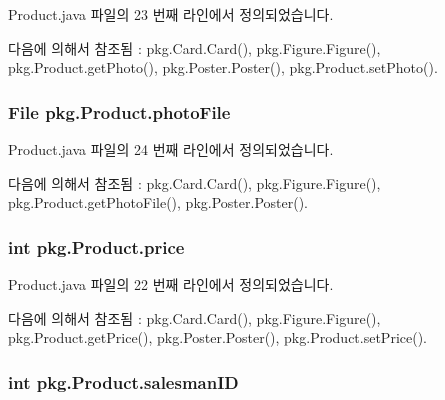 Product.\+java 파일의 23 번째 라인에서 정의되었습니다.



다음에 의해서 참조됨 \+:  pkg.\+Card.\+Card(), pkg.\+Figure.\+Figure(), pkg.\+Product.\+get\+Photo(), pkg.\+Poster.\+Poster(), pkg.\+Product.\+set\+Photo().

\subsubsection[{\texorpdfstring{photo\+File}{photoFile}}]{\setlength{\rightskip}{0pt plus 5cm}File pkg.\+Product.\+photo\+File\hspace{0.3cm}{\ttfamily [protected]}}\hypertarget{classpkg_1_1_product_a2eeaba74c302ecdc9dd288ff7527ac67}{}\label{classpkg_1_1_product_a2eeaba74c302ecdc9dd288ff7527ac67}


Product.\+java 파일의 24 번째 라인에서 정의되었습니다.



다음에 의해서 참조됨 \+:  pkg.\+Card.\+Card(), pkg.\+Figure.\+Figure(), pkg.\+Product.\+get\+Photo\+File(), pkg.\+Poster.\+Poster().

\subsubsection[{\texorpdfstring{price}{price}}]{\setlength{\rightskip}{0pt plus 5cm}int pkg.\+Product.\+price\hspace{0.3cm}{\ttfamily [protected]}}\hypertarget{classpkg_1_1_product_a46c6eb6906d4ee2f6393515f41dba7c9}{}\label{classpkg_1_1_product_a46c6eb6906d4ee2f6393515f41dba7c9}


Product.\+java 파일의 22 번째 라인에서 정의되었습니다.



다음에 의해서 참조됨 \+:  pkg.\+Card.\+Card(), pkg.\+Figure.\+Figure(), pkg.\+Product.\+get\+Price(), pkg.\+Poster.\+Poster(), pkg.\+Product.\+set\+Price().

\subsubsection[{\texorpdfstring{salesman\+ID}{salesmanID}}]{\setlength{\rightskip}{0pt plus 5cm}int pkg.\+Product.\+salesman\+ID\hspace{0.3cm}{\ttfamily [protected]}}\hypertarget{classpkg_1_1_product_aecf411b201022fca17571e9afbc76747}{}\label{classpkg_1_1_product_aecf411b201022fca17571e9afbc76747}



